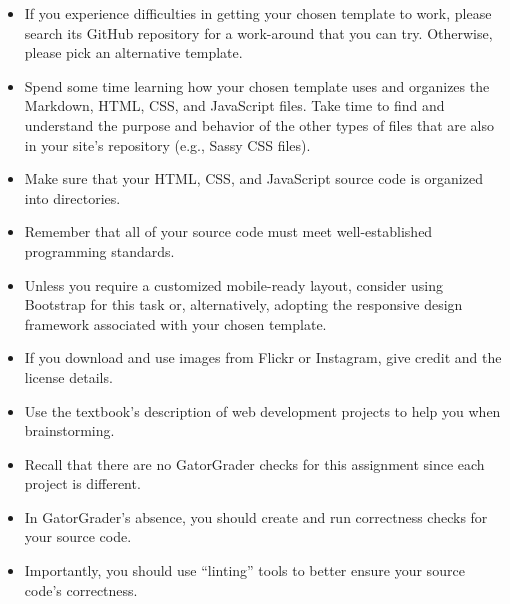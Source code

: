 \documentclass[11pt]{article}
\newcommand{\program}[1]{\lstinline{#1}}
\begin{document}

\begin{itemize}
  \setlength{\itemsep}{0.05in}

  \item If you experience difficulties in getting your chosen template to work,
    please search its GitHub repository for a work-around that you can try.
    Otherwise, please pick an alternative template.

  \item Spend some time learning how your chosen template uses and organizes the
    Markdown, HTML, CSS, and JavaScript files. Take time to find and understand
    the purpose and behavior of the other types of files that are also in your
    site's repository (e.g., Sassy CSS files).

  \item Make sure that your HTML, CSS, and JavaScript source code is organized
    into directories.

  \item Remember that all of your source code must meet well-established
    programming standards.

  \item Unless you require a customized mobile-ready layout, consider using
    Bootstrap for this task or, alternatively, adopting the responsive design
    framework associated with your chosen template.

  \item If you download and use images from Flickr or Instagram, give
    credit and the license details.

  \item Use the textbook's description of web development projects to
    help you when brainstorming.

  \item Recall that there are no GatorGrader checks for this assignment since
    each project is different.

  \item In GatorGrader's absence, you should create and run correctness checks
    for your source code.

  \item Importantly, you should use ``linting'' tools to better ensure your
    source code's correctness.

\end{itemize}
\end{document}
